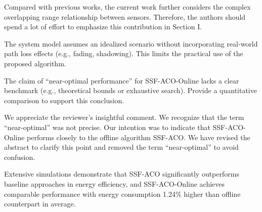 \reviewer

\begin{revcomment}
	Compared with previous works, the current work further considers the complex overlapping range relationship between sensors. Therefore, the authors should spend a lot of effort to emphasize this contribution in Section I.
\end{revcomment}
\begin{revresponse}
\end{revresponse}

\begin{revcomment}
	The system model assumes an idealized scenario without incorporating real-world path loss effects (e.g., fading, shadowing). This limits the practical use of the proposed algorithm.
\end{revcomment}
\begin{revresponse}
\end{revresponse}

\begin{revcomment}
	The claim of ``near-optimal performance'' for SSF-ACO-Online lacks a clear benchmark (e.g., theoretical bounds or exhaustive search). Provide a quantitative comparison to support this conclusion.
\end{revcomment}
\begin{revresponse}
	We appreciate the reviewer's insightful comment.
	We recognize that the term ``near-optimal'' was not precise. Our intention was to indicate that SSF-ACO-Online performs closely to the offline algorithm SSF-ACO. We have revised the abstract to clarify this point and removed the term ``near-optimal'' to avoid confusion.
	\begin{changes}
		Extensive simulations demonstrate that SSF-ACO significantly outperforms baseline approaches in energy efficiency, and SSF-ACO-Online achieves comparable performance with energy consumption 1.24\% higher than offline counterpart in average.
	\end{changes}
\end{revresponse}

